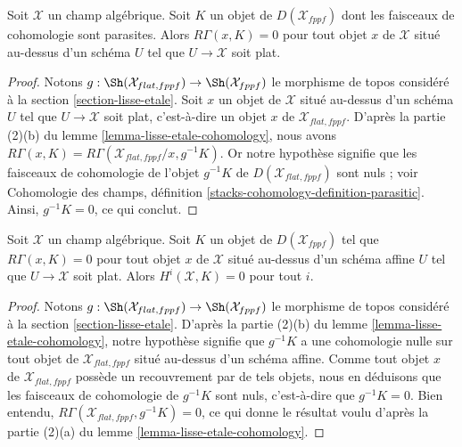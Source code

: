 \begin{lemma}
\label{lemma-cohomology-parasitic}
Soit $\mathcal{X}$ un champ algébrique. Soit $K$ un objet de
$D(\mathcal{X}_{fppf})$ dont les faisceaux de cohomologie sont parasites. Alors
$R\Gamma(x, K) = 0$ pour tout objet $x$ de $\mathcal{X}$ situé au-dessus d'un
schéma $U$ tel que $U \to \mathcal{X}$ soit plat.
\end{lemma}

\begin{proof}
Notons $g : \Sh(\mathcal{X}_{flat, fppf}) \to \Sh(\mathcal{X}_{fppf})$ le
morphisme de topos considéré à la section \ref{section-lisse-etale}. Soit $x$
un objet de $\mathcal{X}$ situé au-dessus d'un schéma $U$ tel que
$U \to \mathcal{X}$ soit plat, c'est-à-dire un objet $x$ de
$\mathcal{X}_{flat, fppf}$. D'après la partie (2)(b) du lemme
\ref{lemma-lisse-etale-cohomology}, nous avons
$R\Gamma(x, K) = R\Gamma(\mathcal{X}_{flat, fppf}/x, g^{-1}K)$.
Or notre hypothèse signifie que les faisceaux de cohomologie de l'objet
$g^{-1}K$ de $D(\mathcal{X}_{flat, fppf})$ sont nuls ; voir Cohomologie des
champs, définition \ref{stacks-cohomology-definition-parasitic}. Ainsi,
$g^{-1}K = 0$, ce qui conclut.
\end{proof}

\begin{lemma}
\label{lemma-cohomology-parasitic-complex}
Soit $\mathcal{X}$ un champ algébrique. Soit $K$ un objet de
$D(\mathcal{X}_{fppf})$ tel que $R\Gamma(x, K) = 0$ pour tout objet $x$ de
$\mathcal{X}$ situé au-dessus d'un schéma affine $U$ tel que
$U \to \mathcal{X}$ soit plat. Alors $H^i(\mathcal{X}, K) = 0$ pour tout $i$.
\end{lemma}

\begin{proof}
Notons $g : \Sh(\mathcal{X}_{flat, fppf}) \to \Sh(\mathcal{X}_{fppf})$ le
morphisme de topos considéré à la section \ref{section-lisse-etale}. D'après la
partie (2)(b) du lemme \ref{lemma-lisse-etale-cohomology}, notre hypothèse
signifie que $g^{-1}K$ a une cohomologie nulle sur tout objet de
$\mathcal{X}_{flat, fppf}$ situé au-dessus d'un schéma affine. Comme tout objet
$x$ de $\mathcal{X}_{flat, fppf}$ possède un recouvrement par de tels objets,
nous en déduisons que les faisceaux de cohomologie de $g^{-1}K$ sont nuls,
c'est-à-dire que $g^{-1}K = 0$. Bien entendu,
$R\Gamma(\mathcal{X}_{flat, fppf}, g^{-1}K) = 0$, ce qui donne le résultat voulu
d'après la partie (2)(a) du lemme \ref{lemma-lisse-etale-cohomology}.
\end{proof}

